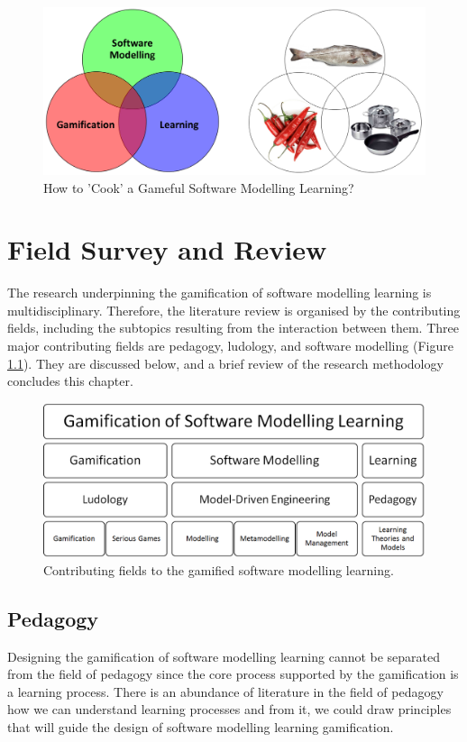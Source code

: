 \documentclass[12pt, a4paper]{report}
\begin{document}
\begin{figure}[ht]
\centering
\includegraphics[width=\textwidth]{smlg}
\caption{How to 'Cook' a Gameful Software Modelling Learning?}
\label{smlg}
\end{figure}




\chapter{Field Survey and Review}
\label{Field Survey and Review}
The research underpinning the gamification of software modelling learning is multidisciplinary. Therefore, the literature review is organised by the contributing fields, including the subtopics resulting from the interaction between them. Three major contributing fields are pedagogy, ludology, and software modelling (Figure \ref{smlg2}). They are discussed below, and a brief review of the research methodology concludes this chapter.

\begin{figure}[ht]
\centering
\includegraphics[width=12cm]{smlg2}
\caption{Contributing fields to the gamified software modelling learning.}
\label{smlg2}
\end{figure}

\section{Pedagogy}
\label{Pedagogy}
Designing the gamification of software modelling learning cannot be separated from the field of pedagogy since the core process supported by the gamification is a learning process. There is an abundance of literature in the field of pedagogy how we can understand learning processes and from it, we could draw principles that will guide the design of software modelling learning gamification. 
\end{document}
